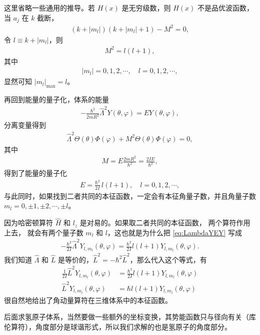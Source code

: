 这里省略一些通用的推导。若 $H(x)$ 是无穷级数，则 $H(x)$ 不是品优波函数，当 $a_j$ 在 $k$ 截断，
\begin{align}
    (k+|m_l|)(k+|m_l|+1) - M^2 = 0, 
\end{align}
令 $l \equiv k + |m_l|$，则
\begin{align}
    M^2 = l(l+1),
\end{align}
其中
\begin{align}
    |m_l| = 0,1,2,\cdots, \quad l = 0,1,2,\cdots,
\end{align}
显然可知 $|m_l|_{\mathrm{max}} = l$。

再回到能量的量子化，体系的能量
\begin{align}
    - \frac{\hbar^2}{2m R^2} \hat\Lambda^2 Y(\theta, \varphi) = E Y(\theta, \varphi), 
    \label{eq:LambdaYEY}
\end{align}
分离变量得到
\begin{align}
    \hat \Lambda^2 \Theta(\theta) \Phi(\varphi) + M^2 \Theta(\theta) \Phi(\varphi)  = 0,
\end{align}
其中
\begin{align}
    M = E \frac{2mR^2}{\hbar^2} = \frac{2IE}{\hbar^2},
\end{align}
得到了能量的量子化
\begin{align}
    E = \frac{\hbar^2}{2I} \, l (l+1), \quad l = 0,1,2,\cdots,
\end{align}
与此同时，如果找到二者共同的本征函数，一定会有本征角量子数，并且角量子数 $m_l = 0, \pm1, \pm2, \cdots, \pm l$。

因为哈密顿算符 $\hat H$ 和 $l_z$ 是对易的。如果取二者共同的本征函数，
两个算符作用上去，
就会有两个量子数 $m_l$ 和 $l$，这也就是为什么把 \eqref{eq:LambdaYEY} 写成
\begin{align}
    - \frac{\hbar^2}{2I} \hat\Lambda^2 Y_{l,m_l}(\theta, \varphi) = \frac{\hbar^2}{2I} l(l+1) Y_{l,m_l}(\theta, \varphi). 
\end{align}
我们知道 $\hat \Lambda$ 和 $\hat L$ 是等价的，$\hat L^2 = -\hbar^2\hat L^2$，那么代入这个等式，有
\begin{align}
    \frac{1}{2I} \hat L^2 Y_{l,m_l}(\theta, \varphi) &= \frac{\hbar^2}{2I} l(l+1) Y_{l,m_l}(\theta, \varphi) \\
    \hat L^2 Y_{l,m_l}(\theta, \varphi) &= \hbar l (l+1) Y_{l,m_l}(\theta, \varphi)\label{eq:6_l_squared}
\end{align}
很自然地给出了角动量算符在三维体系中的本征函数。

后面求氢原子体系，当然要做一些额外的坐标变换，其势能函数只与径向有关（库伦算符），角度部分是球谐形式，所以我们求解的也是氢原子的角度部分。

